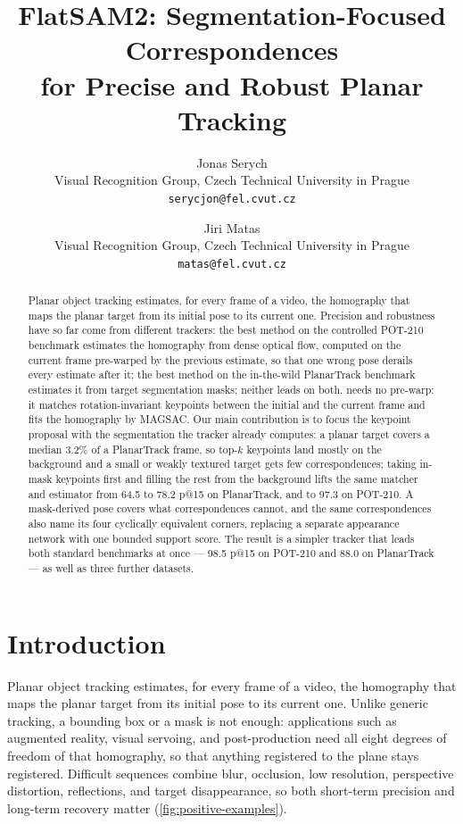 \documentclass[10pt,twocolumn,letterpaper]{article}
\title{FlatSAM2: Segmentation-Focused Correspondences\\
for Precise and Robust Planar Tracking}
\author{Jonas Serych\\
Visual Recognition Group, Czech Technical University in Prague\\
{\tt\small serycjon@fel.cvut.cz}
\and
Jiri Matas\\
Visual Recognition Group, Czech Technical University in Prague\\
{\tt\small matas@fel.cvut.cz}
}
\begin{document}
\maketitle

\begin{abstract}
Planar object tracking estimates, for every frame of a video, the homography that maps the planar target from its initial pose to its current one.
Precision and robustness have so far come from different trackers: the best method on the controlled POT-210 benchmark estimates the homography from dense optical flow, computed on the current frame pre-warped by the previous estimate, so that one wrong pose derails every estimate after it; the best method on the in-the-wild PlanarTrack benchmark estimates it from target segmentation masks; neither leads on both.
\flatsam needs no pre-warp: it matches rotation-invariant \loma keypoints between the initial and the current frame and fits the homography by MAGSAC.
Our main contribution is to focus the keypoint proposal with the segmentation the tracker already computes: a planar target covers a median 3.2\% of a PlanarTrack frame, so top-$k$ keypoints land mostly on the background and a small or weakly textured target gets few correspondences; taking in-mask keypoints first and filling the rest from the background lifts the same matcher and estimator from 64.5 to 78.2 p@15 on PlanarTrack, and to 97.3 on POT-210.
A mask-derived pose covers what correspondences cannot, and the same correspondences also name its four cyclically equivalent corners, replacing a separate appearance network with one bounded support score.
The result is a simpler tracker that leads both standard benchmarks at once --- 98.5 p@15 on POT-210 and 88.0 on PlanarTrack --- as well as three further datasets.
\end{abstract}
\section{Introduction}
\label{sec:introduction}

Planar object tracking estimates, for every frame of a video, the homography that maps the planar target from its initial pose to its current one.
Unlike generic tracking, a bounding box or a mask is not enough: applications such as augmented reality, visual servoing, and post-production need all eight degrees of freedom of that homography, so that anything registered to the plane stays registered.
Difficult sequences combine blur, occlusion, low resolution, perspective distortion, reflections, and target disappearance, so both short-term precision and long-term recovery matter (\cref{fig:positive-examples}).
\end{document}
